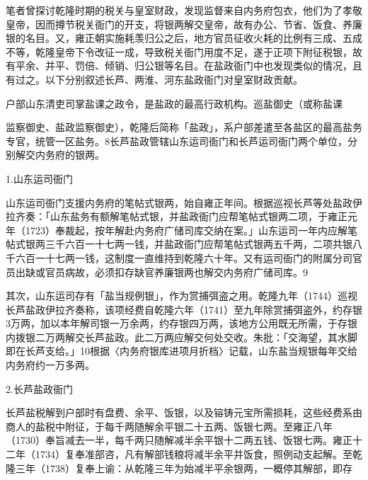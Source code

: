 
笔者曾探讨乾隆时期的税关与皇室财政，发现监督来自内务府包衣，他们为了孝敬皇帝，因而撙节税关衙门的开支，将银两解交皇帝，故有办公、节省、饭食、养廉银的名目。又，雍正朝实施耗羡归公之后，地方官员征收火耗的比例有三成、五成不等，乾隆皇帝下令改征一成，导致税关衙门用度不足，遂于正项下附征税银，故有平余、并平、罚倍、倾销、归公银等名目。在盐政衙门中也发现类似的情况，且有过之。以下分别叙述长芦、两淮、河东盐政衙门对皇室财政贡献。


户部山东清吏司掌盐课之政令，是盐政的最高行政机构。巡盐御史（或称盐课

\vfill
\begin{BookNotes}
\end{BookNotes}

\noindent 监察御史、盐政监察御史），乾隆后简称「盐政」，系户部差遣至各盐区的最高盐务专官，统管一区盐务。8长芦盐政管辖山东运司衙门和长芦运司衙门两个单位，分别解交内务府的银两。

1.山东运司衙门

山东运司衙门支援内务府的笔帖式银两，始自雍正年间。根据巡视长芦等处盐政伊拉齐奏：「山东盐务有额解笔帖式银，并盐政衙门应帮笔帖式银两二项，于雍正元年（1723）奉裁起，按年解赴内务府广储司库交纳在案。」山东运司一年内应解笔帖式银两三千六百一十七两一钱，并盐政衙门应帮笔帖式银两五千两，二项共银八千六百一十七两一钱，这制度一直维持到乾隆六十年。又有运司衙门的附属分司官员出缺或官员病故，必须扣存缺官养廉银两也解交内务府广储司库。9

其次，山东运司存有「盐当规例银」，作为赏捕弭盗之用。乾隆九年（1744）巡视长芦盐政伊拉齐奏称，该项经费自乾隆六年（1741）至九年除赏捕弭盗外，约存银3万两，加以本年解司银一万余两，约存银四万两，该地方公用既无所需，于存银内拨银二万两解交长芦盐政。此二万两应解交何处交收。朱批：「交海望，其水脚即在长芦支给。」10根据〈内务府银库进项月折档〉记载，山东盐当规银每年交给内务府约一万多两。

2.长芦盐政衙门

长芦盐税解到户部时有盘费、余平、饭银，以及镕铸元宝所需损耗，这些经费系由商人的盐税中附征，于每千两随解余平银二十五两、饭银七两。至雍正八年（1730）奉旨减去一半，每千两只随解减半余平银十二两五钱、饭银七两。雍正十二年（1734）复奉准部咨，凡有解部钱粮将减半余平并饭食，照例动支起解。至乾隆三年（1738）复奉上谕：从乾隆三年为始减半平余银两，一概停其解部，即存

